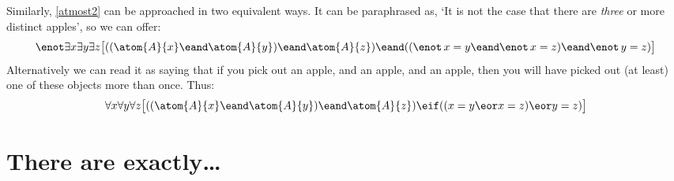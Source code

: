 Similarly, \cref*{atmost2} can be approached in two equivalent ways.
It can be paraphrased as, `It is not the case that there are
\emph{three} or more distinct apples', so we can offer:
\[
	\enot \exists x \exists y\exists z\bigl[((\atom{A}{x} \eand \atom{A}{y}) \eand \atom{A}{z}) \eand ((\enot\, {x = y} \eand \enot\, {x = z}) \eand \enot\, {y = z})\bigr]
\]
Alternatively we can read it as saying that if you pick out an apple,
and an apple, and an apple, then you will have picked out (at least)
one of these objects more than once. Thus:
\[
	\forall x\forall y\forall z\bigl[((\atom{A}{x} \eand \atom{A}{y}) \eand \atom{A}{z}) \eif ((x=y \eor x=z) \eor y=z)\bigr]
\]


\section{There are exactly\ldots}\label{sec:exactlyn}


